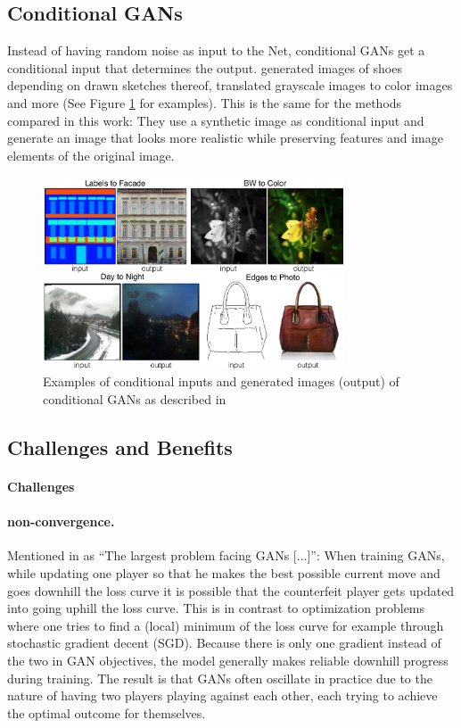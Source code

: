 \subsection{Conditional GANs}
Instead of having random noise as input to the Net, conditional GANs get a conditional input that determines the output. \cite{DBLP:journals/corr/IsolaZZE16} generated images of shoes depending on drawn sketches thereof, translated grayscale images to color images and more (See Figure \ref{fig:I2I_examples} for examples). This is the same for the methods compared in this work: They use a synthetic image as conditional input and generate an image that looks more realistic while preserving features and image elements of the original image.

\begin{figure}
	\centering
	\includegraphics[width=0.8\textwidth]{../images/I2I_examples.png}
	\caption{Examples of conditional inputs and generated images (output) of conditional GANs as described in \cite{DBLP:journals/corr/IsolaZZE16}}
	\label{fig:I2I_examples}
\end{figure}

\newpage

\subsection{Challenges and Benefits}
\paragraph{Challenges}
\paragraph{non-convergence.} Mentioned in \cite{DBLP:journals/corr/Goodfellow17} as ``The largest problem facing GANs [...]'': When training GANs, while updating one player so that he makes the best possible current move and goes downhill the loss curve it is possible that the counterfeit player gets updated into going uphill the loss curve. This is in contrast to optimization problems where one tries to find a (local) minimum of the loss curve for example through stochastic gradient decent (SGD). Because there is only one gradient instead of the two in GAN objectives, the model generally makes reliable downhill progress during training. The result is that GANs often oscillate in practice due to the nature of having two players playing against each other, each trying to achieve the optimal outcome for themselves. 


